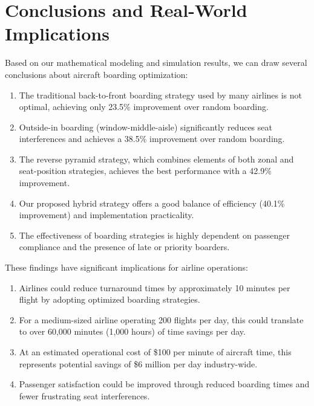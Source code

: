 \documentclass[12pt,a4paper]{article}
\begin{document}
\section{Conclusions and Real-World Implications}

Based on our mathematical modeling and simulation results, we can draw several conclusions about aircraft boarding optimization:

\begin{enumerate}
    \item The traditional back-to-front boarding strategy used by many airlines is not optimal, achieving only 23.5\% improvement over random boarding.
    
    \item Outside-in boarding (window-middle-aisle) significantly reduces seat interferences and achieves a 38.5\% improvement over random boarding.
    
    \item The reverse pyramid strategy, which combines elements of both zonal and seat-position strategies, achieves the best performance with a 42.9\% improvement.
    
    \item Our proposed hybrid strategy offers a good balance of efficiency (40.1\% improvement) and implementation practicality.
    
    \item The effectiveness of boarding strategies is highly dependent on passenger compliance and the presence of late or priority boarders.
\end{enumerate}

These findings have significant implications for airline operations:

\begin{enumerate}
    \item Airlines could reduce turnaround times by approximately 10 minutes per flight by adopting optimized boarding strategies.
    
    \item For a medium-sized airline operating 200 flights per day, this could translate to over 60,000 minutes (1,000 hours) of time savings per day.
    
    \item At an estimated operational cost of \$100 per minute of aircraft time, this represents potential savings of \$6 million per day industry-wide.
    
    \item Passenger satisfaction could be improved through reduced boarding times and fewer frustrating seat interferences.
\end{enumerate}
\end{document}
